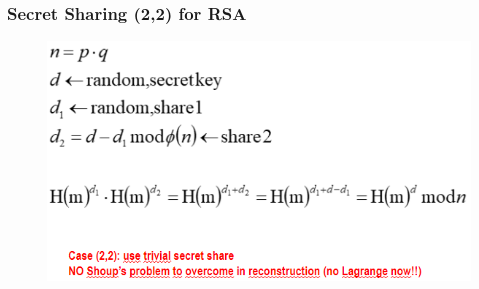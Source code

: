 \documentclass{book}
\begin{document}
\subsubsection{Secret Sharing (2,2) for RSA}
\begin{figure}[h]
	\includegraphics[scale=0.5]{2022-01-06-17-30-36.png}%
\end{figure}
\end{document}
